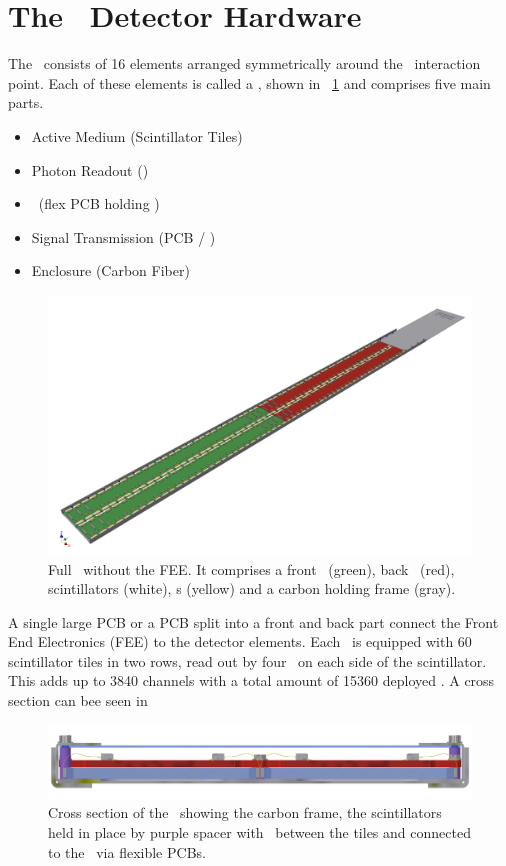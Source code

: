 \documentclass[../BTOF_summary.tex]{subfiles}
\begin{document}
\section{The \btof\ Detector Hardware}

The \btofD\ consists of 16 elements arranged symmetrically around the \panda\ interaction point. Each of these elements is called a \sm , shown in \fig ~\ref{fig:SuperModule} and comprises five main parts.

\begin{itemize}
	\item Active Medium (Scintillator Tiles)
	\item Photon Readout (\sipm)
	\item \sensorboard\ (flex PCB holding \sipms )
	\item Signal Transmission (PCB / \railboard )
	\item Enclosure (Carbon Fiber)
\end{itemize}

\begin{figure}[htbp]
	\centering
	\includegraphics[width=.8\textwidth]{fig/Supermodule_Design_full_open-min.jpg}
	\caption{Full \sm\ without the FEE. It comprises a front \railboard\ (green), back \railboard\ (red), scintillators (white), \sensorboard s (yellow) and a carbon holding frame (gray).}
	\label{fig:SuperModule}
\end{figure}

A single large PCB or a PCB split into a front and back part connect the Front End Electronics (FEE) to the detector elements. 
Each \sm\ is equipped with 60 scintillator tiles in two rows, read out by four \sipms\ on each side of the scintillator. 
This adds up to 3840 channels with a total amount of \num{15360} deployed \sipms .
A cross section can bee seen in \fig ~

\begin{figure}[htbp]
	\centering
	\includegraphics[width=.8\textwidth]{fig/Railboard3_Schnitt.jpg}
	\caption{Cross section of the \btof\ showing the carbon frame, the scintillators held in place by purple spacer with \sipms\ between the tiles and connected to the \railboard\ via flexible \sensorboard PCBs.}
\end{figure}
\end{document}
